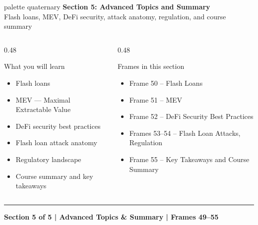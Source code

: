 \documentclass[8pt,aspectratio=169]{beamer}
\newcommand{\bottomnote}[1]{\vfill\vspace{-2mm}\textcolor{mllavender2}{\rule{\textwidth}{0.4pt}}\vspace{1mm}\footnotesize\textbf{#1}}
\begin{document}
\begin{frame}
  \begin{beamercolorbox}[sep=12pt,center,rounded=true,shadow=true]{palette quaternary}
    {\Large\bfseries Section 5: Advanced Topics and Summary}\\{}\vspace{6pt}
    {\normalsize Flash loans, MEV, DeFi security, attack anatomy, regulation, and course summary}
  \end{beamercolorbox}
  \vspace{8mm}
  \begin{columns}[T]
    \begin{column}{0.48\textwidth}
      \begin{block}{What you will learn}
        \begin{itemize}\setlength\itemsep{2pt}
          \item Flash loans
          \item MEV --- Maximal Extractable Value
          \item DeFi security best practices
          \item Flash loan attack anatomy
          \item Regulatory landscape
          \item Course summary and key takeaways
        \end{itemize}
      \end{block}
    \end{column}
    \begin{column}{0.48\textwidth}
      \begin{block}{Frames in this section}
        \begin{itemize}\setlength\itemsep{2pt}
          \item Frame 50 -- Flash Loans
          \item Frame 51 -- MEV
          \item Frame 52 -- DeFi Security Best Practices
          \item Frames 53--54 -- Flash Loan Attacks, Regulation
          \item Frame 55 -- Key Takeaways and Course Summary
        \end{itemize}
      \end{block}
    \end{column}
  \end{columns}
  \bottomnote{Section 5 of 5 | Advanced Topics \& Summary | Frames 49--55}
\end{frame}
\end{document}
